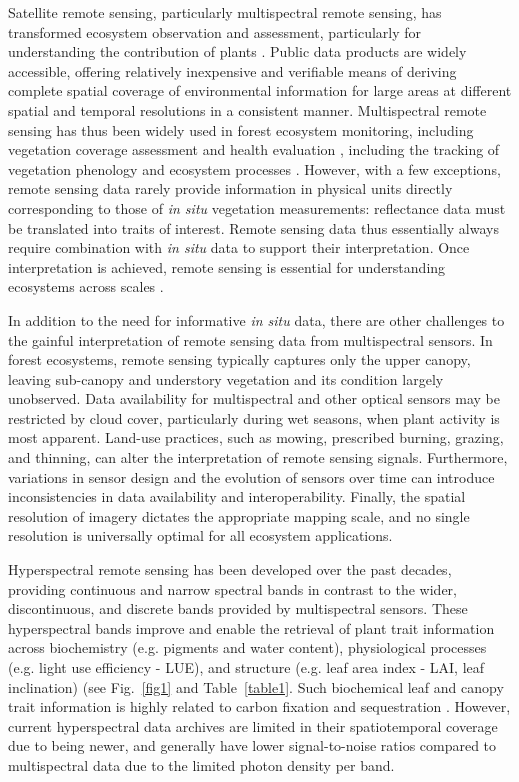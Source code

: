 \documentclass[pdflatex,sn-mathphys-num]{sn-jnl}%
\theoremstyle{thmstyleone}%
\theoremstyle{thmstyletwo}%
\theoremstyle{thmstylethree}%
\begin{document}
Satellite remote sensing, particularly multispectral remote sensing, has transformed ecosystem observation and assessment, particularly for understanding the contribution of plants \cite{andrew2014potential,pettorelli2018satellite}. 
Public data products are widely accessible, offering relatively inexpensive and verifiable means of deriving complete spatial coverage of environmental information for large areas at different spatial and temporal resolutions in a consistent manner. Multispectral remote sensing has thus been widely used in forest ecosystem monitoring, including vegetation coverage assessment and health evaluation \cite{zarco2019chlorophyll,brown2025grounded,cherif2022deepforest}, including the tracking of vegetation phenology and ecosystem processes \cite{dronova2022remote}. However, with a few exceptions, remote sensing data rarely provide information in physical units directly corresponding to those of \textit{in situ} vegetation measurements: reflectance data must be translated into traits of interest. Remote sensing data thus essentially always require combination with \textit{in situ} data to support their interpretation. Once interpretation is achieved, remote sensing is essential for understanding ecosystems across scales \cite{cavender2025spectral}. 

In addition to the need for informative \textit{in situ} data, there are other challenges to the gainful interpretation of remote sensing data from multispectral sensors. In forest ecosystems, remote sensing typically captures only the upper canopy, leaving sub-canopy and understory vegetation and its condition largely unobserved. Data availability for multispectral and other optical sensors may be restricted by cloud cover, particularly during wet seasons, when plant activity is most apparent. Land-use practices, such as mowing, prescribed burning, grazing, and thinning, can alter the interpretation of remote sensing signals. Furthermore, variations in sensor design and the evolution of sensors over time can introduce inconsistencies in data availability and interoperability. Finally, the spatial resolution of imagery dictates the appropriate mapping scale, and no single resolution is universally optimal for all ecosystem applications.

Hyperspectral remote sensing has been developed over the past decades, providing continuous and narrow spectral bands in contrast to the wider, discontinuous, and discrete bands provided by multispectral sensors. These hyperspectral bands improve and enable the retrieval of plant trait information across biochemistry (e.g. pigments and water content), physiological processes (e.g. light use efficiency - LUE), and structure (e.g. leaf area index - LAI, leaf inclination) (see Fig.~\ref{fig1} and Table~\ref{table1}. Such biochemical leaf and canopy trait information is highly related to carbon fixation and sequestration \cite{richardson2002evaluation,le2004towards,blackburn2007hyperspectral}. However, current hyperspectral data archives are limited in their spatiotemporal coverage due to being newer, and generally have lower signal-to-noise ratios compared to multispectral data due to the limited photon density per band. 
\end{document}
